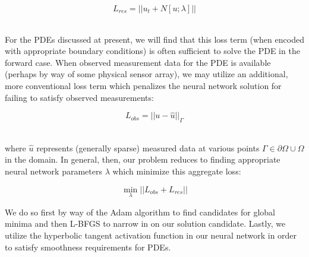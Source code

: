 \documentclass[letterpaper,11pt]{article}
\begin{document}
    $$
    L_{res} = ||u_t + N[u; \lambda]||
    $$

    \ \\
    For the PDEs discussed at present, we will find that this loss term (when encoded with appropriate boundary 
    conditions) is often sufficient to solve the PDE in the forward case. When observed measurement data for the PDE 
    is available (perhaps by way of some physical sensor array), we may utilize an additional, more conventional loss 
    term which penalizes the neural network solution for failing to satisfy observed measurements:

    $$
    L_{obs} = ||u - \hat{u}||_{\Gamma}
    $$

    \ \\
    \noindent where $\hat{u}$ represents (generally sparse) measured data at various points 
    $\Gamma \in \partial \Omega \cup \Omega$ in the domain. In general, then, our problem reduces to finding appropriate
    neural network parameters $\lambda$ which minimize this aggregate loss:
    
    \begin{equation}
        \min_{\lambda}{||L_{obs} + L_{res}||}
    \end{equation}

    We do so first by way of the Adam\cite{adam} algorithm to find candidates for global minima and then L-BFGS to 
    narrow in on our solution candidate. Lastly, we utilize the hyperbolic tangent activation function in our neural 
    network in order to satisfy smoothness requirements for PDEs.

\end{document}
